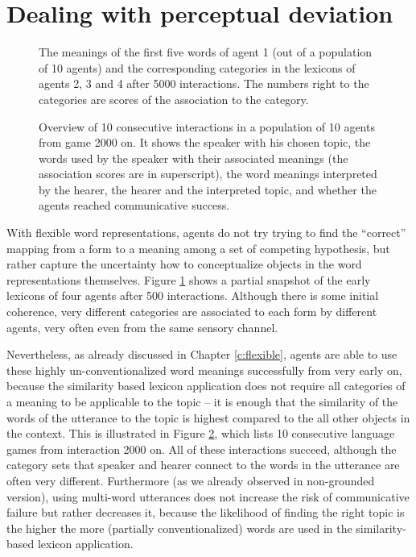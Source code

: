 \section{Dealing with perceptual deviation}


\begin{figure}[p]
  
  \caption{The meanings of the first five words of agent 1 (out of a
    population of 10 agents) and the corresponding categories in the
    lexicons of agents 2, 3 and 4 after 5000 interactions. The numbers
    right to the categories are scores of the association to the
    category.}
\label{f:gfwm-lexicon-forms-500}
\end{figure}

\begin{figure}[p]
  {}
  \caption{Overview of 10 consecutive interactions in a population of
    10 agents from game 2000 on. It shows the speaker with his chosen
    topic, the words used by the speaker with their associated
    meanings (the association scores are in superscript), the word
    meanings interpreted by the hearer, the hearer and the interpreted
    topic, and whether the agents reached communicative success.}
  \label{f:gfwm-trace}
\end{figure}


With flexible word representations, agents do not try trying to find
the ``correct'' mapping from a form to a meaning among a set of
competing hypothesis, but rather capture the uncertainty how to
conceptualize objects in the word representations themselves. Figure
\ref{f:gfwm-lexicon-forms-500} shows a partial snapshot of the early
lexicons of four agents after 500 interactions. Although there is some
initial coherence, very different categories are associated to each
form by different agents, very often even from the same sensory
channel.



Nevertheless, as already discussed in Chapter \ref{c:flexible}, agents
are able to use these highly un-conventionalized word meanings
successfully from very early on, because the similarity based lexicon
application does not require all categories of a meaning to be
applicable to the topic -- it is enough that the similarity of the
words of the utterance to the topic is highest compared to the all
other objects in the context. This is illustrated in Figure
\ref{f:gfwm-trace}, which lists 10 consecutive language games from
interaction 2000 on. All of these interactions succeed, although the
category sets that speaker and hearer connect to the words in the
utterance are often very different. Furthermore (as we already
observed in non-grounded version), using multi-word utterances does
not increase the risk of communicative failure but rather decreases
it, because the likelihood of finding the right topic is the higher
the more (partially conventionalized) words are used in the
similarity-based lexicon application.

